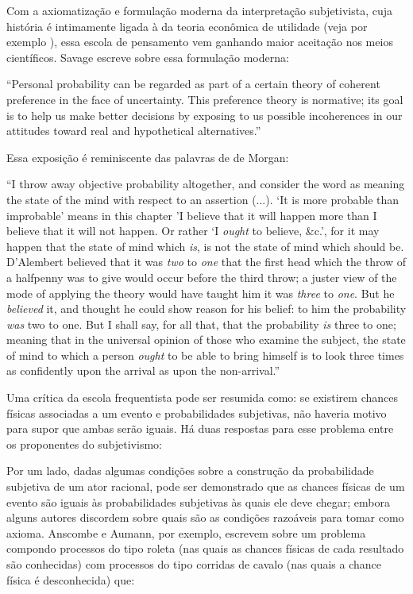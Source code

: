 \documentclass[12pt,a4paper]{article}
\begin{document}
Com a axiomatização e formulação moderna da interpretação subjetivista, cuja história é intimamente ligada à da teoria
econômica de utilidade (veja por exemplo \cite{Friedman48}),
essa escola de pensamento vem ganhando maior aceitação nos meios científicos. Savage escreve sobre essa formulação moderna:

``Personal probability can be regarded as part of a certain theory of coherent preference in the face of uncertainty. This
preference theory is normative; its goal is to help us make better decisions by exposing to us possible incoherences in our
attitudes toward real and hypothetical alternatives.''\cite{Savage67}

Essa exposição é reminiscente das palavras de de Morgan:

``I throw away objective probability altogether, and consider the word as meaning the state of the mind with respect to an 
assertion (...). `It is more probable than improbable' means in this chapter 'I believe that it will happen more than I 
believe that it will not happen. Or rather `I {\em ought} to believe, \&c.', for it may happen that the state of mind which {\em
is}, is not the state of mind which should be. 
D'Alembert believed that it was {\em two} to {\em one} that the first head which the throw of a halfpenny was to give would occur
before the third throw; a juster view of the mode of applying the theory would have taught him it was {\em three} to {\em one}.
But he {\em believed} it, and thought he could show reason for his belief: to him the probability {\em was} two to one. But 
I shall say, for all that, that the probability {\em is} three to one; meaning that in the universal opinion of those who
examine the subject, the state of mind to which a person {\em ought} to be able to bring himself is to look three times
as confidently upon the arrival as upon the non-arrival.''\cite{deMorgan1847}

Uma crítica da escola frequentista pode ser resumida como: se existirem chances físicas associadas a um evento
e probabilidades subjetivas, não haveria motivo para supor que ambas serão iguais. Há duas respostas para esse problema 
entre os proponentes do subjetivismo:

Por um lado, dadas algumas condições sobre a construção da
probabilidade subjetiva de um ator racional, pode ser demonstrado que as chances físicas de um evento são iguais 
às probabilidades subjetivas às quais ele deve chegar; embora
alguns autores discordem sobre quais são as condições razoáveis para tomar como axioma. Anscombe e Aumann, por exemplo,
escrevem sobre um problema compondo processos do tipo roleta (nas quais as chances físicas de cada resultado são conhecidas) 
com processos do tipo corridas de cavalo (nas quais a chance física é desconhecida) que:
\end{document}
